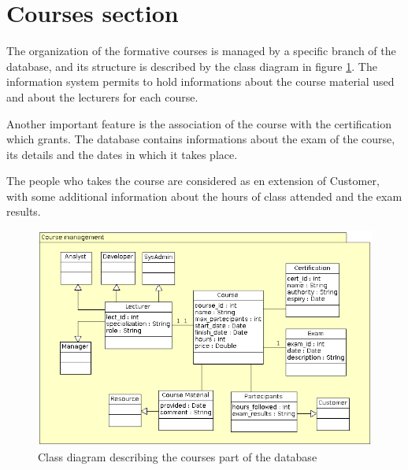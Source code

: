 \section{Courses section}
The organization of the formative courses is managed by a specific branch
of the database, and its structure is described by the class diagram in
figure \ref{3img:classcou}.
The information system permits to hold informations about the course
material used and about the lecturers for each course.

Another important feature is the association of the course with the
certification which grants. 
The database contains informations about the exam of the course, its
details and the dates in which it takes place.

The people who takes the course are considered as en extension  of
Customer, with some additional information about the hours of class
attended and the exam results.

\begin{figure}[H]
\centering
\includegraphics[scale=0.60]{assign3/argo/imgs/courses.png}
\caption{Class diagram describing the courses part of the database}
\label{3img:classcou}
\end{figure}

